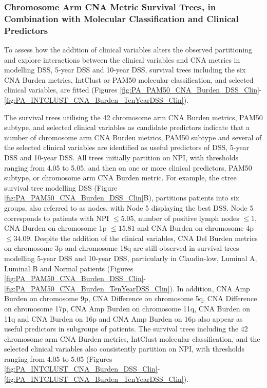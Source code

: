 \subsubsection{Chromosome Arm CNA Metric Survival Trees, in Combination with Molecular Classification and Clinical Predictors} 
To assess how the addition of clinical variables alters the observed partitioning and explore interactions between the clinical variables and CNA metrics in modelling DSS, 5-year DSS and 10-year DSS, survival trees including the six CNA Burden metrics, IntClust or PAM50 molecular classification, and selected clinical variables, are fitted (Figures \ref{fig:PA_PAM50_CNA_Burden_DSS_Clin}-\ref{fig:PA_INTCLUST_CNA_Burden_TenYearDSS_Clin}). 

The survival trees utilising the 42 chromosome arm CNA Burden metrics, PAM50 subtype, and selected clinical variables as candidate predictors indicate that a number of chromosome arm CNA Burden metrics, PAM50 subtype and several of the selected clinical variables are identified as useful predictors of DSS, 5-year DSS and 10-year DSS. All trees initially partition on NPI, with thresholds ranging from 4.05 to 5.05, and then on one or more clinical predictors, PAM50 subtype, or chromosome arm CNA Burden metric. For example, the ctree survival tree modelling DSS (Figure \ref{fig:PA_PAM50_CNA_Burden_DSS_Clin}B), partitions patients into six groups, also referred to as nodes, with Node 5 displaying the best DSS. Node 5 corresponds to patients with NPI $\leq 5.05$, number of positive lymph nodes $\leq 1$, CNA Burden on chromosome 1p $\leq 15.81$ and CNA Burden on chromosome 4p $\leq 34.09$. Despite the addition of the clinical variables, CNA Del Burden metrics on chromosome 3p and chromosome 18q are still observed in survival trees modelling 5-year DSS and 10-year DSS, particularly in Claudin-low, Luminal A, Luminal B and Normal patients (Figures \ref{fig:PA_PAM50_CNA_Burden_DSS_Clin}-\ref{fig:PA_PAM50_CNA_Burden_TenYearDSS_Clin}). In addition, CNA Amp Burden on chromosome 9p, CNA Difference on chromosome 5q, CNA Difference on chromosome 17p, CNA Amp Burden on chromosome 11q, CNA Burden on 11q and CNA Burden on 16p and CNA Amp Burden on 16p also appear as useful predictors in subgroups of patients. The survival trees including the 42 chromosome arm CNA Burden metrics, IntClust molecular classification, and the selected clinical variables also consistently partition on NPI, with thresholds ranging from 4.05 to 5.05 (Figures \ref{fig:PA_INTCLUST_CNA_Burden_DSS_Clin}-\ref{fig:PA_INTCLUST_CNA_Burden_TenYearDSS_Clin}). 

